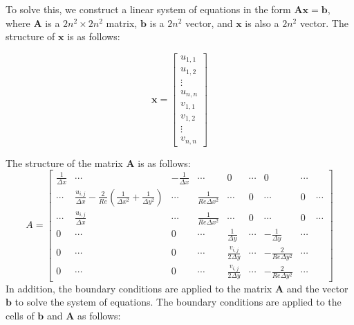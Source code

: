 \documentclass{article}
\begin{document}
To solve this, we construct a linear system of equations in the form \( \mathbf{A} \mathbf{x} = \mathbf{b} \), where \( \mathbf{A} \) is a \( 2n^2 \times 2n^2 \) matrix, \( \mathbf{b} \) is a \( 2n^2 \) vector, and \( \mathbf{x} \) is also a \( 2n^2 \) vector. The structure of \( \mathbf{x} \) is as follows:

\[
\mathbf{x} = \begin{bmatrix}
u_{1,1} \\
u_{1,2} \\
\vdots \\
u_{n,n} \\
v_{1,1} \\
v_{1,2} \\
\vdots \\
v_{n,n}
\end{bmatrix}
\]

The structure of the matrix \( \mathbf{A} \) is as follows:
\[
A = 
\begin{bmatrix}
\frac{1}{\Delta x} & \cdots & -\frac{1}{\Delta x} & \cdots & 0 & \cdots & 0 & \cdots \\
\cdots & \frac{u_{i,j}}{\Delta x} - \frac{2}{Re} \left(\frac{1}{\Delta x^2} + \frac{1}{\Delta y^2}\right) & \cdots & \frac{1}{Re \Delta x^2} & \cdots & 0 & \cdots & 0 & \cdots \\
\cdots & \frac{u_{i,j}}{\Delta x} & \cdots & \frac{1}{Re \Delta x^2} & \cdots & 0 & \cdots & 0 & \cdots \\
0 & \cdots & 0 & \cdots & \frac{1}{\Delta y} & \cdots & -\frac{1}{\Delta y} & \cdots \\
0 & \cdots & 0 & \cdots & \frac{v_{i,j}}{2\Delta y} & \cdots & -\frac{2}{Re \Delta y^2} & \cdots \\
0 & \cdots & 0 & \cdots & \frac{v_{i,j}}{2\Delta y} & \cdots & -\frac{2}{Re \Delta y^2} & \cdots
\end{bmatrix}
\]
In addition, the boundary conditions are applied to the matrix \( \mathbf{A} \) and the vector \( \mathbf{b} \) to solve the system of equations.
The boundary conditions are applied to the cells of \( \mathbf{b} \) and \( \mathbf{A} \) as follows:
\end{document}
